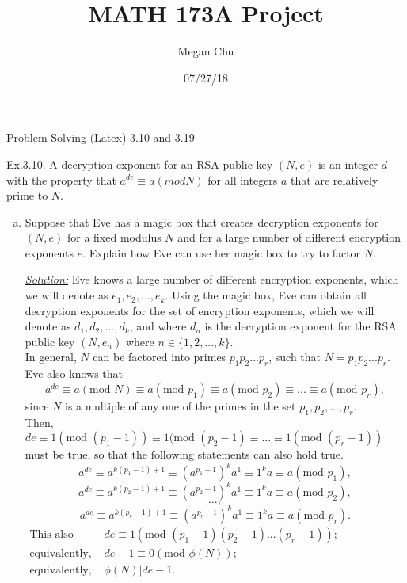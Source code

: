 \documentclass[12pt]{article}
\title{MATH 173A Project}
\author{Megan Chu}
\date{07/27/18}
\begin{document}
\maketitle
\centerline{Problem Solving (Latex) 3.10 and 3.19}\pagebreak

\noindent Ex.3.10. A decryption exponent for an RSA public key $(N, e)$ is an integer $d$ with the property that $a^{de} \equiv a (mod N)$ for all integers $a$ that are relatively prime to $N$.

\begin{enumerate}[a)]




  \item Suppose that Eve has a magic box that creates decryption exponents for $(N, e)$ for a fixed modulus $N$ and for a large number of different encryption exponents $e$. Explain how Eve can use her magic box to try to factor $N$.
  
  \color{blue}
  \item[\underline{\textit{Solution:}}] Eve knows a large number of different encryption exponents, which we will denote as $e_{1}, e_{2}, ..., e_{k}$.  Using the magic box, Eve can obtain all decryption exponents for the set of encryption exponents, which we will denote as $d_{1}, d_{2}, ..., d_{k}$, and where $d_n$ is the decryption exponent for the RSA public key $(N, e_{n})$ where $n \in \{1, 2, ..., k\}$.  \\
  
  In general, $N$ can be factored into primes $p_{1}p_{2}...p_{r}$, such that $N=p_{1}p_{2}...p_{r}$.  Eve also knows that 
  $$a^{de} \equiv a (\text{mod } N) \equiv a (\text{mod } p_{1}) \equiv a (\text{mod } p_{2}) \equiv ... \equiv a (\text{mod } p_{r}),$$
  since $N$ is a multiple of any one of the primes in the set $p_{1}, p_{2}, ..., p_{r}$.  \\
  
  Then, $de \equiv 1 (\text{mod } (p_{1}-1)) \equiv 1 (\text{mod } (p_{2}-1) \equiv ... \equiv 1 (\text{mod } (p_{r}-1))$ must be true, so that the following statements can also hold true. \\
  $$a^{de} \equiv a^{k(p_{1}-1)+1} \equiv (a^{p_{1}-1})^{k}a^{1} \equiv 1^{k}a \equiv a (\text{mod } p_{1}),$$
  $$a^{de} \equiv a^{k(p_{2}-1)+1} \equiv (a^{p_{2}-1})^{k}a^{1} \equiv 1^{k}a \equiv a (\text{mod } p_{2}),$$ 
  $$...,$$
  $$a^{de} \equiv a^{k(p_{r}-1)+1} \equiv (a^{p_{r}-1})^{k}a^{1} \equiv 1^{k}a \equiv a (\text{mod } p_{r}).$$
  \begin{align*}
  \text{This also implies that }&de \equiv 1 (\text{mod } (p_{1}-1)(p_{2}-1)...(p_{r}-1));\phantom{abcdefghijklmnopqrstuvwxy} \\
  \text{equivalently, }&de-1 \equiv 0 (\text{mod } \phi (N)); \\
  \text{equivalently, }&\phi (N) | de-1.  
  \end{align*}
  

\end{enumerate}
\end{document}
